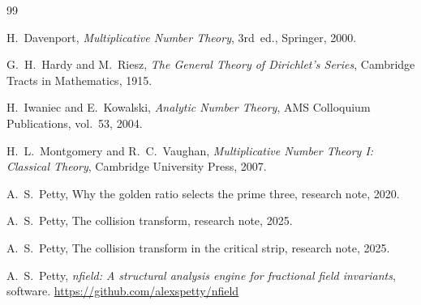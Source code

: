 \documentclass[12pt]{amsart}
\theoremstyle{definition}
\theoremstyle{remark}
\begin{document}
\begin{thebibliography}{99}

H.~Davenport,
\emph{Multiplicative Number Theory},
3rd~ed., Springer, 2000.

G.~H.~Hardy and M.~Riesz,
\emph{The General Theory of Dirichlet's Series},
Cambridge Tracts in Mathematics, 1915.

H.~Iwaniec and E.~Kowalski,
\emph{Analytic Number Theory},
AMS Colloquium Publications, vol.~53, 2004.

H.~L.~Montgomery and R.~C.~Vaughan,
\emph{Multiplicative Number Theory I: Classical Theory},
Cambridge University Press, 2007.

A.~S.~Petty,
Why the golden ratio selects the prime three,
research note, 2020.

A.~S.~Petty,
The collision transform,
research note, 2025.

A.~S.~Petty,
The collision transform in the critical strip,
research note, 2025.

A.~S.~Petty,
\emph{nfield: A structural analysis engine for fractional
field invariants},
software.
\url{https://github.com/alexspetty/nfield}

\end{thebibliography}
\end{document}
